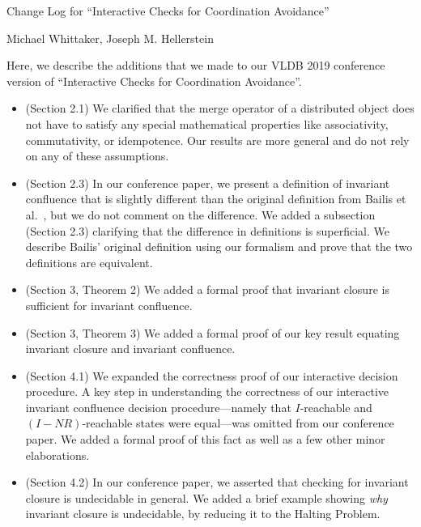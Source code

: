 \documentclass[12pt]{article}
\begin{document}
\begin{center}
  {\huge Change Log for ``Interactive Checks for Coordination Avoidance''}

  Michael Whittaker, Joseph M. Hellerstein
\end{center}

Here, we describe the additions that we made to our VLDB 2019 conference
version of ``Interactive Checks for Coordination Avoidance''.

\begin{itemize}
  \item (Section 2.1)
    We clarified that the merge operator of a distributed object does not have
    to satisfy any special mathematical properties like associativity,
    commutativity, or idempotence. Our results are more general and do not rely
    on any of these assumptions.

  \item (Section 2.3)
    In our conference paper, we present a definition of invariant confluence
    that is slightly different than the original definition from Bailis et
    al.~\cite{bailis2014coordination}, but we do not comment on the difference.
    We added a subsection (Section 2.3) clarifying that the difference in
    definitions is superficial. We describe Bailis' original definition using
    our formalism and prove that the two definitions are equivalent.

  \item (Section 3, Theorem 2)
    We added a formal proof that invariant closure is sufficient for invariant
    confluence.

  \item (Section 3, Theorem 3)
    We added a formal proof of our key result equating invariant closure and
    invariant confluence.

  \item (Section 4.1)
    We expanded the correctness proof of our interactive decision procedure. A
    key step in understanding the correctness of our interactive invariant
    confluence decision procedure---namely that $I$-reachable and
    $(I-NR)$-reachable states were equal---was omitted from our conference
    paper. We added a formal proof of this fact as well as a few other minor
    elaborations.

  \item (Section 4.2)
    In our conference paper, we asserted that checking for invariant closure is
    undecidable in general. We added a brief example showing \emph{why}
    invariant closure is undecidable, by reducing it to the Halting Problem.


\end{itemize}
\end{document}
